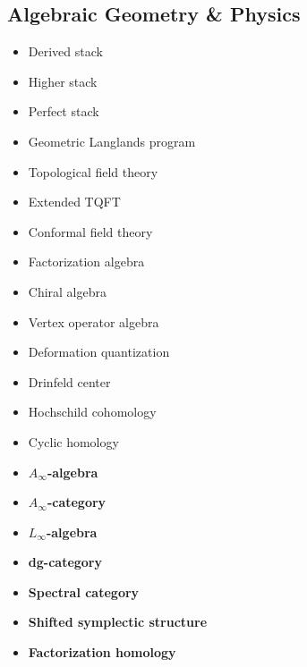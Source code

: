 \subsection{Algebraic Geometry \& Physics}

\begin{itemize}
\item Derived stack
\item Higher stack
\item Perfect stack
\item Geometric Langlands program
\item Topological field theory
\item Extended TQFT
\item Conformal field theory
\item Factorization algebra
\item Chiral algebra
\item Vertex operator algebra
\item Deformation quantization
\item Drinfeld center
\item Hochschild cohomology
\item Cyclic homology
\item \textbf{$A_\infty$-algebra}
\item \textbf{$A_\infty$-category}
\item \textbf{$L_\infty$-algebra}
\item \textbf{dg-category}
\item \textbf{Spectral category}
\item \textbf{Shifted symplectic structure}
\item \textbf{Factorization homology}
\end{itemize}